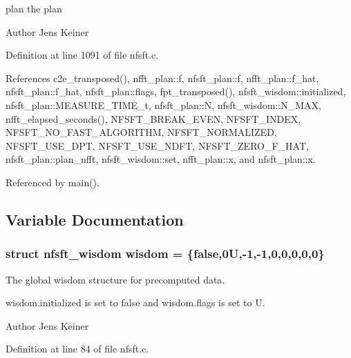 \begin{DoxyItemize}
\item plan the plan\end{DoxyItemize}
\begin{DoxyAuthor}{Author}
Jens Keiner 
\end{DoxyAuthor}


Definition at line 1091 of file nfsft.\-c.



References c2e\-\_\-transposed(), nfft\-\_\-plan\-::f, nfsft\-\_\-plan\-::f, nfft\-\_\-plan\-::f\-\_\-hat, nfsft\-\_\-plan\-::f\-\_\-hat, nfsft\-\_\-plan\-::flags, fpt\-\_\-transposed(), nfsft\-\_\-wisdom\-::initialized, nfsft\-\_\-plan\-::\-M\-E\-A\-S\-U\-R\-E\-\_\-\-T\-I\-M\-E\-\_\-t, nfsft\-\_\-plan\-::\-N, nfsft\-\_\-wisdom\-::\-N\-\_\-\-M\-A\-X, nfft\-\_\-elapsed\-\_\-seconds(), N\-F\-S\-F\-T\-\_\-\-B\-R\-E\-A\-K\-\_\-\-E\-V\-E\-N, N\-F\-S\-F\-T\-\_\-\-I\-N\-D\-E\-X, N\-F\-S\-F\-T\-\_\-\-N\-O\-\_\-\-F\-A\-S\-T\-\_\-\-A\-L\-G\-O\-R\-I\-T\-H\-M, N\-F\-S\-F\-T\-\_\-\-N\-O\-R\-M\-A\-L\-I\-Z\-E\-D, N\-F\-S\-F\-T\-\_\-\-U\-S\-E\-\_\-\-D\-P\-T, N\-F\-S\-F\-T\-\_\-\-U\-S\-E\-\_\-\-N\-D\-F\-T, N\-F\-S\-F\-T\-\_\-\-Z\-E\-R\-O\-\_\-\-F\-\_\-\-H\-A\-T, nfsft\-\_\-plan\-::plan\-\_\-nfft, nfsft\-\_\-wisdom\-::set, nfft\-\_\-plan\-::x, and nfsft\-\_\-plan\-::x.



Referenced by main().



\subsection{Variable Documentation}
\hypertarget{group__nfsft_ga0af81d81e1b436949ddc46dbd27346e5}{
\subsubsection[{wisdom}]{\setlength{\rightskip}{0pt plus 5cm}struct {\bf nfsft\-\_\-wisdom} wisdom = \{false,0\-U,-\/1,-\/1,0,0,0,0,0\}\hspace{0.3cm}{\ttfamily [static]}}}\label{group__nfsft_ga0af81d81e1b436949ddc46dbd27346e5}


The global wisdom structure for precomputed data. 

{\ttfamily wisdom.\-initialized} is set to {\ttfamily false} and {\ttfamily wisdom.\-flags} is set to {\-U}.

\begin{DoxyAuthor}{Author}
Jens Keiner 
\end{DoxyAuthor}


Definition at line 84 of file nfsft.\-c.

